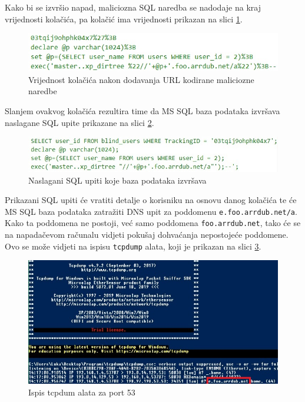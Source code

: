 \documentclass[12pt, oneside, onecolumn]{book}
\begin{document}
{Kako bi se izvršio napad, maliciozna SQL naredba se nadodaje na kraj vrijednosti kolačića, pa kolačić ima vrijednosti prikazan na slici \ref{fig:bsqli_mpay}.

\begin{figure}[H]
	\begin{center}
		\includegraphics[width=\textwidth]{bsqli_mpay.jpg}
		\caption{Vrijednost kolačića nakon dodavanja URL kodirane maliciozne naredbe} \label{fig:bsqli_mpay}
	\end{center}
\end{figure}

Slanjem ovakvog kolačića rezultira time da MS SQL baza podataka izvršava naslagane SQL upite prikazane na slici \ref{fig:bsqli_fsql}.

\begin{figure}[H]
	\begin{center}
		\includegraphics[width=\textwidth]{bsqli_fsql.jpg}
		\caption{Naslagani SQL upiti koje baza podataka izvršava} \label{fig:bsqli_fsql}
	\end{center}
\end{figure}

Prikazani SQL upiti će vratiti detalje o korisniku na osnovu danog kolačića te će MS SQL baza podataka zatražiti DNS upit za poddomenu \texttt{e.foo.arrdub.net/a}. Kako ta poddomena ne postoji, već samo poddomena \texttt{foo.arrdub.net}, tako će se na napadačevom računalu vidjeti pokušaj dohvaćanja nepostojeće poddomene. Ovo se može vidjeti na ispisu \texttt{tcpdump} alata, koji je prikazan na slici \ref{fig:bsql_td}.

\begin{figure}[H]
	\begin{center}
		\includegraphics[width=\textwidth]{bsql_td.jpg}
		\caption{Ispis tcpdum alata za port 53} \label{fig:bsql_td}
	\end{center}
\end{figure}

}
\end{document}
